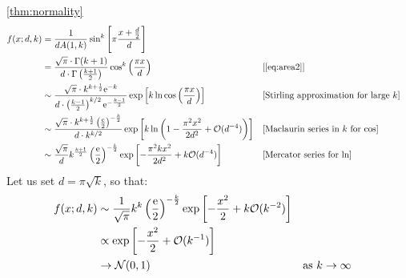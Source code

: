 \begin{proofof}{\autoref{thm:normality}}
    \begin{align*}
        f(x; d,k)
        &= \frac{1}{d A(1, k)} \sin^k \left[ \pi \frac{x + \frac{d}{2}}{d} \right]\\
        &= \frac{\sqrt \pi \cdot \Gamma(k+1)}{d \cdot \Gamma\left(\frac{k+1}{2}\right)} \cos^k \left( \frac{\pi x}{d} \right)  &&  [\text{\autoref{eq:area2}}]\\
        &\sim \frac{\sqrt \pi \cdot k^{k + \frac{1}{2}} \e^{-k}}{d \cdot \left(\frac{k-1}{2}\right)^{k/2} \e^{- \frac{k-1}{2}}} \exp \left[ k \ln \cos\pfrac{\pi x}{d} \right]  &&  [\text{Stirling approximation for large $k$}]\\
        &\sim \frac{\sqrt \pi \cdot k^{k + \frac{1}{2}} \pfrac{\e}{2}^{-\frac{k}{2}}}{d \cdot k^{k/2}} \exp \left[ k \ln \left( 1 - \frac{\pi^2 x^2}{2 d^2} + \O(d^{-4}) \right) \right]  &&  [\text{Maclaurin series in $k$ for $\cos$}]\\
        &\sim \frac{\sqrt \pi}{d} k^\frac{k+1}{2} \pfrac{\e}{2}^{-\frac{k}{2}} \exp \left[- \frac{\pi^2 k x^2}{2 d^2} + k\O(d^{-4}) \right]  &&  [\text{Mercator series for $\ln$}]
    \end{align*}
    Let us set $d = \pi \sqrt k$, so that:
    \begin{align*}
        f(x; d,k)
        &\sim \frac{1}{\sqrt \pi} k^k \left( \frac{\mathrm e}{2} \right)^{-\frac{k}{2}} \exp \left[- \frac{x^2}{2} + k\mathcal O(k^{-2}) \right]\\
        &\propto \exp \left[- \frac{x^2}{2} + \mathcal O(k^{-1}) \right]\\
        &\to \mathcal{N}(0,1) &&  \text{as $k \to \infty$}
    \end{align*}
\end{proofof}

